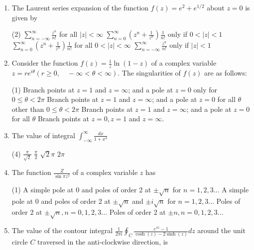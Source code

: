 \begin{enumerate}[label=\color{ocre}\textbf{\arabic*.}]
	\item The Laurent series expansion of the function $f(z)=e^{2}+e^{1 / 2}$ about $z=0$ is given by
	{}
	\begin{tasks}(2)
		\task[\textbf{A.}] $\sum_{n=-\infty}^{\infty} \frac{z^{n}}{n !}$ for all $|z|<\infty$
		\task[\textbf{B.}] $\sum_{n=0}^{\infty}\left(z^{n}+\frac{1}{z^{n}}\right) \frac{1}{n !}$ only if $0<|z|<1$
		\task[\textbf{C.}] $\sum_{n=0}^{\infty}\left(z^{n}+\frac{1}{z^{n}}\right) \frac{1}{n !}$ for all $0<|z|<\infty$
		\task[\textbf{D.}]  $\sum_{n=-\infty}^{\infty} \frac{z^{n}}{n !}$ only if $|z|<1$
	\end{tasks}
	\item Consider the function $f(z)=\frac{1}{z} \ln (1-z)$ of a complex variable $z=r e^{i \theta}(r \geq 0, \quad-\infty<\theta<\infty)$. The singularities of $f(z)$ are as follows:
	{}
	\begin{tasks}(1)
		\task[\textbf{A.}]  Branch points at $z=1$ and $z=\infty$; and a pole at $z=0$ only for $0 \leq \theta<2 \pi$
		\task[\textbf{B.}] Branch points at $z=1$ and $z=\infty$; and a pole at $z=0$ for all $\theta$ other than $0 \leq \theta<2 \pi$
		\task[\textbf{C.}] Branch points at $z=1$ and $z=\infty$; and a pole at $z=0$ for all $\theta$
		\task[\textbf{D.}] Branch points at $z=0, z=1$ and $z=\infty$.
	\end{tasks}
	\item  The value of integral $\int_{-\infty}^{\infty} \frac{d x}{1+x^{4}}$
	{}
	\begin{tasks}(4)
		\task[\textbf{A.}] $\frac{\pi}{\sqrt{2}}$
		\task[\textbf{B.}] $\frac{\pi}{2}$
		\task[\textbf{C.}] $\sqrt{2} \pi$
		\task[\textbf{D.}] $2 \pi$
	\end{tasks}
	\item  The function $\frac{Z}{\sin \pi z^{2}}$ of a complex variable $z$ has
	{}
	\begin{tasks}(1)
		\task[\textbf{A.}] A simple pole at 0 and poles of order 2 at $\pm \sqrt{n}$ for $n=1,2,3 \ldots$
		\task[\textbf{B.}] A simple pole at 0 and poles of order 2 at $\pm \sqrt{n}$ and $\pm i \sqrt{n}$ for $n=1,2,3 \ldots$
		\task[\textbf{C.}] Poles of order 2 at $\pm \sqrt{n}, n=0,1,2,3 \ldots$
		\task[\textbf{D.}] Poles of order 2 at $\pm n, n=0,1,2,3 \ldots$
	\end{tasks}
	\item The value of the contour integral $\frac{1}{2 \pi i} \oint_{C} \frac{e^{4 z}-1}{\cosh (z)-2 \sinh (z)} d z$ around the unit circle $C$ traversed in the anti-clockwise direction, is

\end{enumerate}
